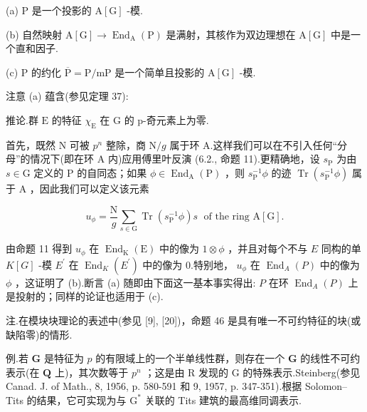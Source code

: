 \documentclass[10pt]{article}
\begin{document}
(a) \(\mathrm{P}\) 是一个投影的 \(\mathrm{A}\left\lbrack  \mathrm{G}\right\rbrack\) -模.

(b) 自然映射 \(\mathrm{A}\left\lbrack  \mathrm{G}\right\rbrack   \rightarrow  {\operatorname{End}}_{\mathrm{A}}\left( \mathrm{P}\right)\) 是满射，其核作为双边理想在 \(\mathrm{A}\left\lbrack  \mathrm{G}\right\rbrack\) 中是一个直和因子.

(c) \(\mathrm{P}\) 的约化 \(\overline{\mathrm{P}} = \mathrm{P}/\mathrm{{mP}}\) 是一个简单且投影的 \(\mathrm{A}\left\lbrack  \mathrm{G}\right\rbrack\) -模.

注意 (a) 蕴含(参见定理 37):

推论.群 \(\mathrm{E}\) 的特征 \({\chi }_{\mathrm{E}}\) 在 \(\mathrm{G}\) 的 p-奇元素上为零.

首先，既然 \(\mathrm{N}\) 可被 \({p}^{n}\) 整除，商 \(\mathrm{N}/g\) 属于环 A.这样我们可以在不引入任何“分母”的情况下(即在环 A 内)应用傅里叶反演 (6.2., 命题 11).更精确地，设 \({s}_{\mathrm{P}}\) 为由 \(s \in  \mathrm{G}\) 定义的 \(\mathrm{P}\) 的自同态；如果 \(\phi  \in  {\operatorname{End}}_{\mathrm{A}}\left( \mathrm{P}\right)\) ，则 \({s}_{\mathrm{P}}^{-1}\phi\) 的迹 \(\operatorname{Tr}\left( {{s}_{\mathrm{P}}^{-1}\phi }\right)\) 属于 \(\mathrm{A}\) ，因此我们可以定义该元素

\[
{u}_{\phi } = \frac{\mathrm{N}}{g}\mathop{\sum }\limits_{{s \in  \mathrm{G}}}\operatorname{Tr}\left( {{s}_{\mathrm{P}}^{-1}\phi }\right) s\;\text{ of the ring }\mathrm{A}\left\lbrack  \mathrm{G}\right\rbrack  .
\]

由命题 11 得到 \({u}_{\phi }\) 在 \({\operatorname{End}}_{\mathrm{K}}\left( \mathrm{E}\right)\) 中的像为 \(1 \otimes  \phi\) ，并且对每个不与 \(E\) 同构的单 \(K\left\lbrack  G\right\rbrack\) -模 \({E}^{\prime }\) 在 \({\operatorname{End}}_{K}\left( {E}^{\prime }\right)\) 中的像为 0.特别地， \({u}_{\phi }\) 在 \({\operatorname{End}}_{A}\left( P\right)\) 中的像为 \(\phi\) ，这证明了 (b).断言 (a) 随即由下面这一基本事实得出: \(P\) 在环 \({\operatorname{End}}_{A}\left( P\right)\) 上是投射的；同样的论证也适用于 (c).

注.在模块块理论的表述中(参见 [9], [20])，命题 46 是具有唯一不可约特征的块(或缺陷零)的情形.

例.若 \(\mathbf{G}\) 是特征为 \(p\) 的有限域上的一个半单线性群，则存在一个 \(\mathbf{G}\) 的线性不可约表示(在 \(\mathbf{Q}\) 上)，其次数等于 \({p}^{n}\) ；这是由 \(\mathrm{R}\) 发现的 \(\mathrm{G}\) 的特殊表示.Steinberg(参见 Canad. J. of Math., 8, 1956, p. 580-591 和 9, 1957, p. 347-351).根据 Solomon–Tits 的结果，它可实现为与 \({\mathrm{G}}^{ * }\) 关联的 Tits 建筑的最高维同调表示.
\end{document}
